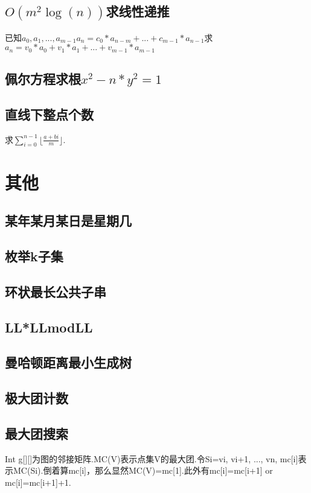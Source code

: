 \documentclass[landscape,a4paper]{article}
\begin{document}
\begin{spacing}{0.3}
\begin{multicols}{2}
	\subsection{$O(m^2 \log(n))$求线性递推}
	已知$a_0, a_1, ..., a_{m - 1}$$a_n = c_0 * a_{n - m} + ... + c_{m - 1} * a_{n - 1}$求$a_n = v_0 * a_0 + v_1 * a_1 + ... + v_{m - 1} * a_{m - 1}$
	
	\subsection{佩尔方程求根$x^2-n*y^2=1$}
	
	\subsection{直线下整点个数}
	求$\displaystyle\sum_{i=0}^{n-1} \lfloor\frac{a+bi}{m}\rfloor$.
	
	
	
	
	
	\section{其他}
	\subsection{某年某月某日是星期几}
	
	\subsection{枚举k子集}
	
	\subsection{环状最长公共子串}
	
	\subsection{LL*LLmodLL}
	
	\subsection{曼哈顿距离最小生成树}
	
	\subsection{极大团计数}
	
	\subsection{最大团搜索}
	Int g[][]为图的邻接矩阵.MC(V)表示点集V的最大团.令Si={vi, vi+1, ..., vn}, mc[i]表示MC(Si).倒着算mc[i]，那么显然MC(V)=mc[1].此外有mc[i]=mc[i+1] or mc[i]=mc[i+1]+1.
	

\end{multicols}
\end{spacing}
\end{document}
